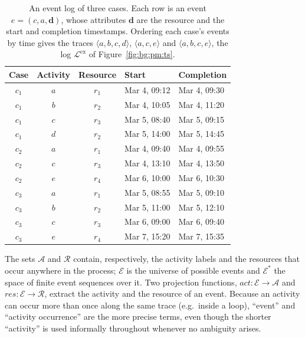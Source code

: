     \begin{table}[h]
      \centering
      \small
      \begin{tabular}{cccll}
        \toprule
        Case & Activity & Resource & Start & Completion \\
        \midrule
        $c_1$ & $a$ & $r_1$ & Mar 4, 09:12 & Mar 4, 09:30 \\
        $c_1$ & $b$ & $r_2$ & Mar 4, 10:05 & Mar 4, 11:20 \\
        $c_1$ & $c$ & $r_3$ & Mar 5, 08:40 & Mar 5, 09:15 \\
        $c_1$ & $d$ & $r_2$ & Mar 5, 14:00 & Mar 5, 14:45 \\
        \midrule
        $c_2$ & $a$ & $r_1$ & Mar 4, 09:40 & Mar 4, 09:55 \\
        $c_2$ & $c$ & $r_3$ & Mar 4, 13:10 & Mar 4, 13:50 \\
        $c_2$ & $e$ & $r_4$ & Mar 6, 10:00 & Mar 6, 10:30 \\
        \midrule
        $c_3$ & $a$ & $r_1$ & Mar 5, 08:55 & Mar 5, 09:10 \\
        $c_3$ & $b$ & $r_2$ & Mar 5, 11:00 & Mar 5, 12:10 \\
        $c_3$ & $c$ & $r_3$ & Mar 6, 09:00 & Mar 6, 09:40 \\
        $c_3$ & $e$ & $r_4$ & Mar 7, 15:20 & Mar 7, 15:35 \\
        \bottomrule
      \end{tabular}
      \caption{An event log of three cases. Each row is an event
        $e = (c, a, \mathbf{d})$, whose attributes $\mathbf{d}$ are the
        resource and the start and completion timestamps. Ordering each case's
        events by time gives the traces $\langle a,b,c,d\rangle$,
        $\langle a,c,e\rangle$ and $\langle a,b,c,e\rangle$, the log
        $\mathcal{L}^{\mathrm{ex}}$ of Figure~\ref{fig:bg:pm:ts}.}
      \label{tab:bg:pm:log}
    \end{table}

    The sets $\mathcal{A}$ and $\mathcal{R}$ contain, respectively, the activity
    labels and the resources that occur anywhere in the process;
    $\mathcal{E}$ is the universe of possible events and $\mathcal{E}^{*}$ the
    space of finite event sequences over it. Two projection functions,
    $act : \mathcal{E} \to \mathcal{A}$ and $res : \mathcal{E} \to \mathcal{R}$,
    extract the activity and the resource of an event. Because an activity can
    occur more than once along the same trace (e.g.\ inside a loop), ``event''
    and ``activity occurrence'' are the more precise terms, even though the
    shorter ``activity'' is used informally throughout whenever no ambiguity
    arises.

